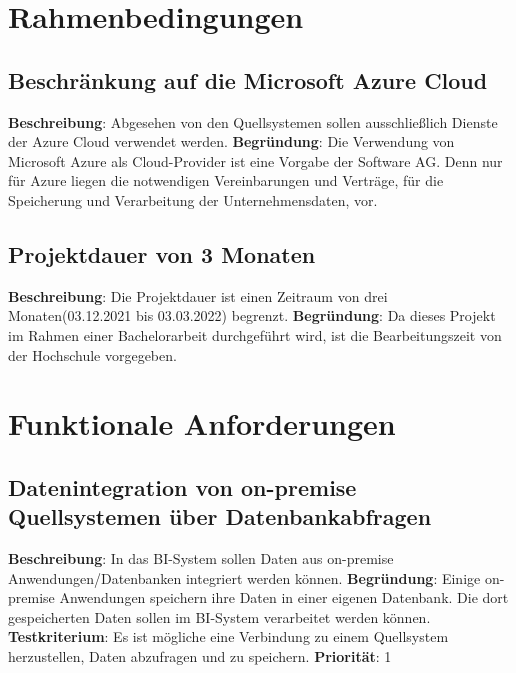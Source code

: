 \section{Rahmenbedingungen} 

\subsection{Beschränkung auf die Microsoft Azure Cloud} \label{sec:anforderungsspezifikation:azureCloud}
\textbf{Beschreibung}: Abgesehen von den Quellsystemen sollen ausschließlich Dienste der Azure Cloud verwendet werden.
\newline \textbf{Begründung}: Die Verwendung von Microsoft Azure als Cloud-Provider ist eine Vorgabe der Software AG. Denn nur für Azure liegen die notwendigen Vereinbarungen und Verträge, für die Speicherung und Verarbeitung der Unternehmensdaten, vor.


\subsection{Projektdauer von 3 Monaten} \label{sec:anforderungsspezifikation:projektDauer}
\textbf{Beschreibung}: Die Projektdauer ist einen Zeitraum von drei Monaten(03.12.2021 bis 03.03.2022) begrenzt.
\newline \textbf{Begründung}:  Da dieses Projekt im Rahmen einer Bachelorarbeit durchgeführt wird, ist die Bearbeitungszeit von der Hochschule vorgegeben.


\section{Funktionale Anforderungen} 

\subsection{Datenintegration von on-premise Quellsystemen über Datenbankabfragen} \label{sec:anforderungsspezifikation:datenintegrationOnPremDB}
\textbf{Beschreibung}: In das BI-System sollen Daten aus on-premise Anwendungen/Datenbanken integriert werden können.
\newline \textbf{Begründung}: Einige on-premise Anwendungen speichern ihre Daten in einer eigenen Datenbank. Die dort gespeicherten Daten sollen im BI-System verarbeitet werden können.
\newline \textbf{Testkriterium}: Es ist mögliche eine Verbindung zu einem Quellsystem herzustellen, Daten abzufragen und zu speichern.
\newline \textbf{Priorität}: 1


